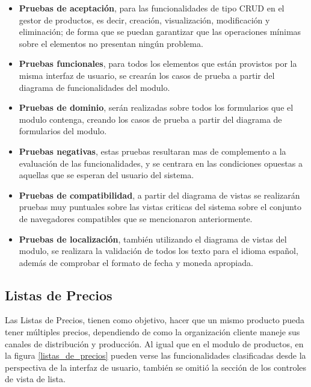 \begin{itemize}
\item \textbf{Pruebas de aceptación}, para las funcionalidades de tipo CRUD en
    el gestor de productos, es decir, creación, visualización, modificación y
    eliminación; de forma que se puedan garantizar que las operaciones mínimas
    sobre el elementos no presentan ningún problema.
\item \textbf{Pruebas funcionales}, para todos los elementos que están provistos
    por la misma interfaz de usuario, se crearán los casos de prueba a partir
    del diagrama de funcionalidades del modulo.
\item \textbf{Pruebas de dominio}, serán realizadas sobre todos los formularios
    que el modulo contenga, creando los casos de prueba a partir del diagrama
    de formularios del modulo.
\item \textbf{Pruebas negativas}, estas pruebas resultaran mas de complemento
    a la evaluación de las funcionalidades, y se centrara en las condiciones
    opuestas a aquellas que se esperan del usuario del sistema.
\item \textbf{Pruebas de compatibilidad}, a partir del diagrama de vistas se
    realizarán pruebas muy puntuales sobre las vistas criticas del sistema sobre
    el conjunto de navegadores compatibles que se mencionaron anteriormente.
\item \textbf{Pruebas de localización}, también utilizando el diagrama de vistas
    del modulo, se realizara la validación de todos los texto para el idioma
    español, además de comprobar el formato de fecha y moneda apropiada.
\end{itemize}

\subsection{Listas de Precios}
Las Listas de Precios, tienen como objetivo, hacer que un mismo producto pueda
tener múltiples precios, dependiendo de como la organización cliente maneje sus
canales de distribución y producción. Al igual que en el modulo de productos, en
la figura \ref{listas_de_precios} pueden verse las funcionalidades clasificadas
desde la perspectiva de la interfaz de usuario, también se omitió la sección de
los controles de vista de lista.

